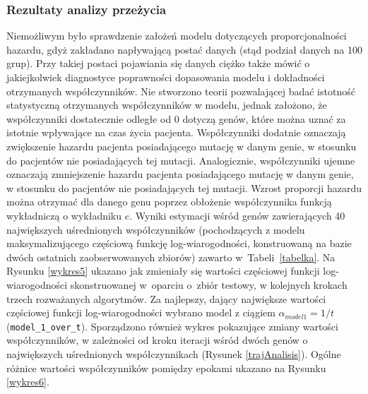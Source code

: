 \subsubsection{Rezultaty analizy przeżycia}
Niemożliwym było sprawdzenie założeń modelu dotyczących proporcjonalności
hazardu, gdyż zakładano napływającą postać danych (stąd podział danych
na 100 grup). Przy takiej postaci pojawiania się danych ciężko także
mówić o jakiejkolwiek diagnostyce poprawności dopasowania modelu i
dokładności otrzymanych współczynników. Nie stworzono teorii
pozwalającej badać istotność statystyczną otrzymanych współczynników w
modelu, jednak założono, że współczynniki dostatecznie odległe od $0$ dotyczą genów, które
można uznać za istotnie wpływające na czas życia pacjenta. Współczynniki
dodatnie oznaczają zwiększenie hazardu pacjenta posiadającego mutację w
danym genie, w stosunku do pacjentów nie posiadających tej mutacji. Analogicznie, współczynniki ujemne oznaczają zmniejszenie hazardu pacjenta
posiadającego mutację w danym genie, w stosunku do pacjentów nie
posiadających tej mutacji. Wzrost proporcji hazardu można
otrzymać dla danego genu poprzez obłożenie współczynnika funkcją
wykładniczą o wykładniku $e$. Wyniki estymacji wśród genów zawierających 40 największych uśrednionych
współczynników (pochodzących z modelu maksymalizującego częściową funkcję log-wiarogodności, konstruowaną na bazie dwóch ostatnich zaobserwowanych zbiorów) zawarto w~Tabeli~\ref{tabelka}.
Na Rysunku \ref{wykres5} ukazano jak zmieniały się wartości częściowej funkcji log-wiarogodności skonstruowanej w~oparciu o~zbiór testowy, w kolejnych krokach trzech rozważanych algorytmów. Za najlepszy, dający największe wartości częściowej funkcji log-wiarogodności wybrano model z ciągiem $\alpha_{model1} = 1/t$ (\texttt{model\_1\_over\_t}). Sporządzono również wykres pokazujące zmiany wartości współczynników, w zależności od kroku iteracji wśród dwóch genów o największych uśrednionych współczynnikach (Rysunek \ref{trajAnalisis}). Ogólne różnice wartości współczynników pomiędzy epokami ukazano na Rysunku \ref{wykres6}.
